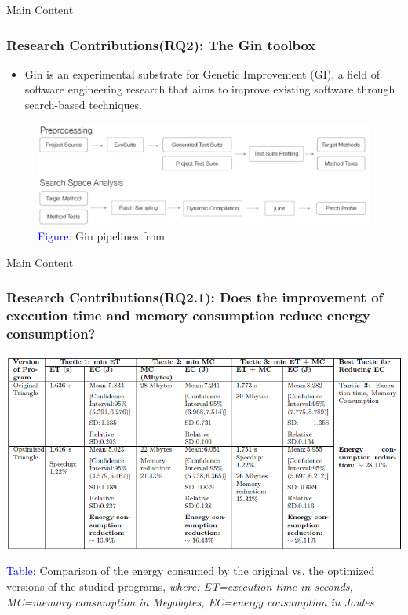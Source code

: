 \documentclass{beamer}
\begin{document}
\begin{frame}{Main Content}
  \frametitle{Research Contributions(RQ2): The Gin toolbox }
  \vspace*{-.5cm} %
  \begin{itemize}
    \item \footnotesize Gin is an experimental substrate for Genetic Improvement (GI), a field of software engineering research that aims to improve existing software through search-based techniques. 
  \end{itemize}
  
  \begin{figure}
    \centering
    \includegraphics[width=1\textwidth]{figures/Slide_16(Gin pipelines).png}
    \caption*{\scriptsize{\textcolor{blue}{Figure}: Gin pipelines from \cite{brownlee2019gin}}}
  \end{figure}
 
\end{frame}


\begin{frame}{Main Content}
  \frametitle{Research Contributions(RQ2.1): Does the improvement of execution time and memory consumption reduce energy consumption?}
  \vspace{-.2cm}
  \begin{table}
    \centering
    \includegraphics[width=\textwidth]{figures/Result_table_f.png}
    \caption*{\tiny{\textcolor{blue}{Table}: Comparison of the energy consumed by the original vs. the optimized versions of the studied programs, \textit{where: ET=execution time in seconds, MC=memory consumption in Megabytes, EC=energy consumption in Joules}}}
  \end{table}
\end{frame}
\end{document}
